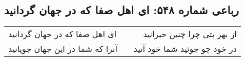 \begin{center}
\section*{رباعی شماره ۵۴۸: ای اهل صفا که در جهان گردانید}
\label{sec:0548}
\begin{longtable}{l p{0.5cm} r}
ای اهل صفا که در جهان گردانید
&&
از بهر بتی چرا چنین حیرانید
\\
آنرا که شما در این جهان جویانید
&&
در خود چو جوئید شما خود آنید
\\
\end{longtable}
\end{center}
